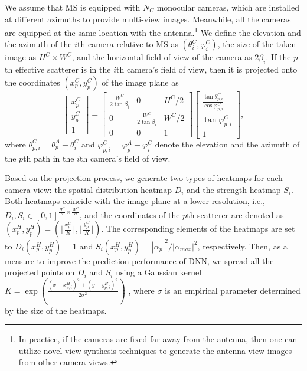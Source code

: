 \documentclass[lettersize,journal]{IEEEtran}
\begin{document}
We assume that MS is equipped with $N_C$ monocular cameras, which are installed at different azimuths to provide multi-view images. 
Meanwhile, all the cameras are equipped at the same location with the antenna.\footnote[1]{In practice, if the cameras are fixed far away from the antenna, then one can utilize novel view synthesis techniques \cite{synthesis} to generate the antenna-view images from other camera views.} 
We define the elevation and the azimuth of the $i$th camera relative to MS as $(\theta_{i}^C, \varphi_{i}^C)$,
the size of the taken image as $H^C \times W^C$, and the horizontal field of view of the camera as $2\beta_i$.
If the $p$th effective scatterer is in the $i$th camera's field of view, then it is projected onto the {coordinates} $(x_{p}^C, y_{p}^C)$ of the image plane as
\setlength{\arraycolsep}{3pt}
\begin{equation}
  \begin{bmatrix} x_{p}^C \\
    y_{p}^C \\
    1\end{bmatrix}
    = \begin{bmatrix} \frac{W^C}{2\tan\beta_i} & 0 & H^C/2 \\
      0 & \frac{W^C}{2\tan\beta_i} & W^C/2 \\
      0 & 0 & 1\end{bmatrix}
      \begin{bmatrix} \frac{\tan\theta_{p,i}^C}{\cos\varphi_{p,i}^C} \\
        \tan\varphi_{p,i}^C \\
        1\end{bmatrix},
\end{equation}
where $\theta_{p,i}^C = \theta_{p}^A - \theta_{i}^C$ and $\varphi_{p,i}^C = \varphi_{p}^A - \varphi_{i}^C$ denote the elevation and the azimuth of the $p$th path in the $i$th camera's field of view.

Based on the projection process, we generate two types of heatmaps for each camera view: the spatial distribution heatmap $D_i$ and the strength heatmap $S_i$. Both heatmaps coincide with the image plane at a lower resolution, i.e., $D_i, S_i \in [0, 1]^{\frac{H^C}{R}\times \frac{W^C}{R}}$, and the coordinates of the $p$th scatterer are denoted as $(x_{p}^H, y_{p}^H) = (\lfloor\frac{x_{p}^C}{R}\rfloor, \lfloor\frac{y_{p}^C}{R}\rfloor)$.
The corresponding elements of the heatmaps are set to $D_{i}(x_{p}^H, y_{p}^H) = 1$ and $S_{i}(x_{p}^H, y_{p}^H) = |\alpha_p|^2/|\alpha_{max}|^2$, respectively.
Then, as a measure to improve the prediction performance of DNN, we {spread} all the projected points on $D_i$ and $ S_i$ using a Gaussian kernel $K = \exp{(\frac{(x - x_{p,i}^H)^2 + (y - y_{p,i}^H)^2}{2\sigma^2})}$ \cite{centernet}, where $\sigma$ is an empirical parameter determined by the size of the heatmaps.
\end{document}
